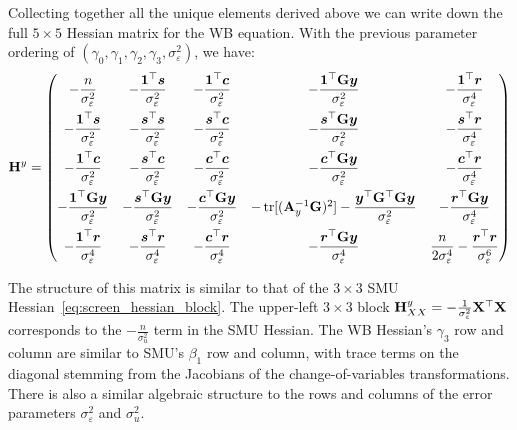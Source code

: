 Collecting together all the unique elements derived above we can write down the full $5 \times 5$ Hessian matrix for the WB equation. With the previous parameter ordering of $(\gamma_0, \gamma_1, \gamma_2, \gamma_3, \sigma_\varepsilon^2)$, we have:
\begin{equation}
\label{eq:wb_hessian_full}
    \mathbf{H}^y = \begin{pmatrix}
        -\dfrac{n}{\sigma_\varepsilon^2}
        & -\dfrac{\bm{1}^\top\bm{s}}{\sigma_\varepsilon^2}
        & -\dfrac{\bm{1}^\top\bm{c}}{\sigma_\varepsilon^2}
        & -\dfrac{\bm{1}^\top\mathbf{G}\bm{y}}{\sigma_\varepsilon^2}
        & -\dfrac{\bm{1}^\top\bm{r}}{\sigma_\varepsilon^4}
        \\[10pt]
        -\dfrac{\bm{1}^\top\bm{s}}{\sigma_\varepsilon^2}
        & -\dfrac{\bm{s}^\top\bm{s}}{\sigma_\varepsilon^2}
        & -\dfrac{\bm{s}^\top\bm{c}}{\sigma_\varepsilon^2}
        & -\dfrac{\bm{s}^\top\mathbf{G}\bm{y}}{\sigma_\varepsilon^2}
        & -\dfrac{\bm{s}^\top\bm{r}}{\sigma_\varepsilon^4}
        \\[10pt]
        -\dfrac{\bm{1}^\top\bm{c}}{\sigma_\varepsilon^2}
        & -\dfrac{\bm{s}^\top\bm{c}}{\sigma_\varepsilon^2}
        & -\dfrac{\bm{c}^\top\bm{c}}{\sigma_\varepsilon^2}
        & -\dfrac{\bm{c}^\top\mathbf{G}\bm{y}}{\sigma_\varepsilon^2}
        & -\dfrac{\bm{c}^\top\bm{r}}{\sigma_\varepsilon^4}
        \\[10pt]
        -\dfrac{\bm{1}^\top\mathbf{G}\bm{y}}{\sigma_\varepsilon^2}
        & -\dfrac{\bm{s}^\top\mathbf{G}\bm{y}}{\sigma_\varepsilon^2}
        & -\dfrac{\bm{c}^\top\mathbf{G}\bm{y}}{\sigma_\varepsilon^2}
        & -\operatorname{tr}[(\mathbf{A}_y^{-1}\mathbf{G})^2] - \dfrac{\bm{y}^\top\mathbf{G}^\top\mathbf{G}\bm{y}}{\sigma_\varepsilon^2}
        & -\dfrac{\bm{r}^\top\mathbf{G}\bm{y}}{\sigma_\varepsilon^4}
        \\[10pt]
        -\dfrac{\bm{1}^\top\bm{r}}{\sigma_\varepsilon^4}
        & -\dfrac{\bm{s}^\top\bm{r}}{\sigma_\varepsilon^4}
        & -\dfrac{\bm{c}^\top\bm{r}}{\sigma_\varepsilon^4}
        & -\dfrac{\bm{r}^\top\mathbf{G}\bm{y}}{\sigma_\varepsilon^4}
        & \dfrac{n}{2\sigma_\varepsilon^4} - \dfrac{\bm{r}^\top\bm{r}}{\sigma_\varepsilon^6}
    \end{pmatrix}
\end{equation}

The structure of this matrix is similar to that of the $3 \times 3$ SMU Hessian~\eqref{eq:screen_hessian_block}. The upper-left $3 \times 3$ block $\mathbf{H}^y_{XX} = -\frac{1}{\sigma_\varepsilon^2}\mathbf{X}^\top\mathbf{X}$ corresponds to the $-\frac{n}{\sigma_u^2}$ term in the SMU Hessian. The WB Hessian's $\gamma_3$ row and column are similar to SMU's $\beta_1$ row and column, with trace terms on the diagonal stemming from the Jacobians of the change-of-variables transformations. There is also a similar algebraic structure to the rows and columns of the error parameters $\sigma_\varepsilon^2$ and $\sigma_u^2$.

